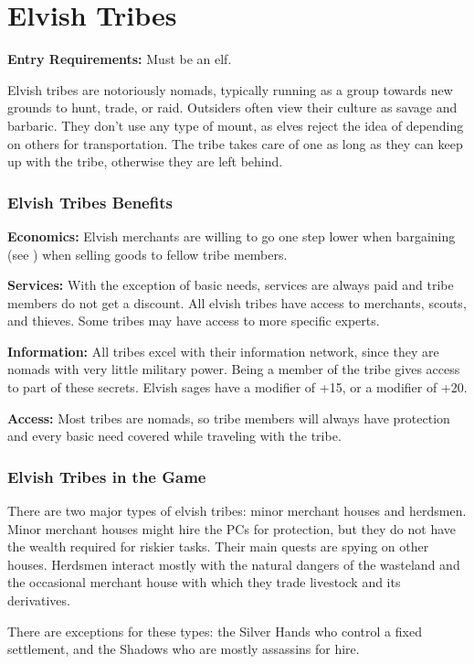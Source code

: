 \section{Elvish Tribes}

\textbf{Entry Requirements:} Must be an elf.

Elvish tribes are notoriously nomads, typically running as a group towards new grounds to hunt, trade, or raid. Outsiders often view their culture as savage and barbaric. They don't use any type of mount, as elves reject the idea of depending on others for transportation. The tribe takes care of one as long as they can keep up with the tribe, otherwise they are left behind.

\subsubsection{Elvish Tribes Benefits}
\textbf{Economics:} Elvish merchants are willing to go one step lower when bargaining (see ) when selling goods to fellow tribe members.

\textbf{Services:} With the exception of basic needs, services are always paid and tribe members do not get a discount. All elvish tribes have access to merchants, scouts, and thieves. Some tribes may have access to more specific experts.

\textbf{Information:} All tribes excel with their information network, since they are nomads with very little military power. Being a member of the tribe gives access to part of these secrets. Elvish sages have a  modifier of +15, or a  modifier of +20.

\textbf{Access:} Most tribes are nomads, so tribe members will always have protection and every basic need covered while traveling with the tribe.

\subsubsection{Elvish Tribes in the Game}
There are two major types of elvish tribes: minor merchant houses and herdsmen. Minor merchant houses might hire the PCs for protection, but they do not have the wealth required for riskier tasks. Their main quests are spying on other houses. Herdsmen interact mostly with the natural dangers of the wasteland and the occasional merchant house with which they trade livestock and its derivatives.

There are exceptions for these types: the Silver Hands who control a fixed settlement, and the Shadows who are mostly assassins for hire.









